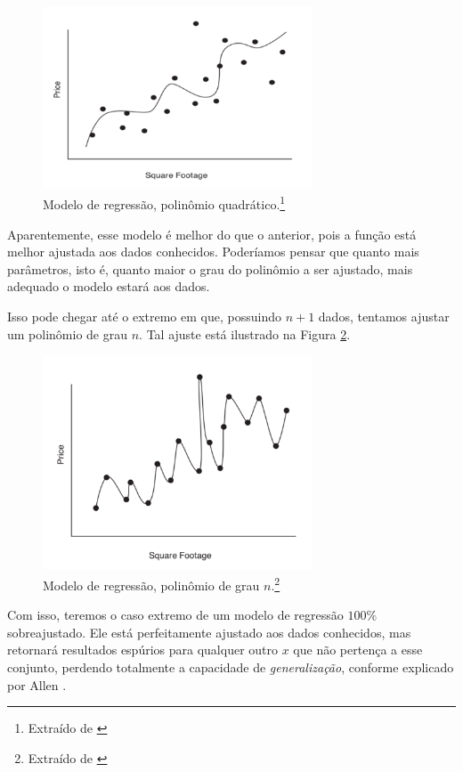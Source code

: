 \begin{figure}[htb]
\centering
\includegraphics[width=8cm]{figuras/over_reg_2}
\caption{Modelo de regressão, polinômio quadrático.\footnote{Extraído de \citep{allen}}}
\label{fig:over_reg_2}
\end{figure}

Aparentemente, esse modelo é melhor do que o anterior, pois a função está melhor ajustada aos dados conhecidos. Poderíamos pensar que quanto mais parâmetros, isto é, quanto maior o grau do polinômio a ser ajustado, mais adequado o modelo estará aos dados. 

Isso pode chegar até o extremo em que, possuindo $n{+}1$ dados, tentamos ajustar um polinômio de grau $n$. Tal ajuste está ilustrado na Figura \ref{fig:over_reg_3}.

\begin{figure}[htb]
\centering
\includegraphics[width=8cm]{figuras/over_reg_3}
\caption{Modelo de regressão, polinômio de grau $n$.\footnote{Extraído de \citep{allen}}}
\label{fig:over_reg_3}
\end{figure}

Com isso, teremos o caso extremo de um modelo de regressão $100\%$ sobreajustado. Ele está perfeitamente ajustado aos dados conhecidos, mas retornará resultados espúrios para qualquer outro $x$ que não pertença a esse conjunto, perdendo totalmente a capacidade de \emph{generalização}, conforme explicado por Allen \citep{allen}.

